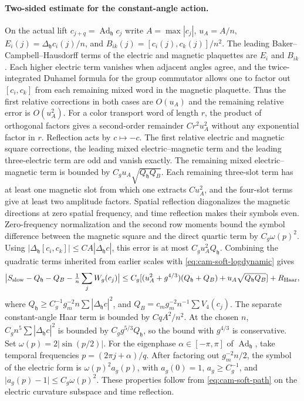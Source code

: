 \documentclass[11pt,a4paper]{article}
\numberwithin{equation}{section}
\newcommand{\hper}{\mathfrak h}
\begin{document}
\paragraph{Two-sided estimate for the constant-angle action.}
On the actual lift \(c_{j+q}=\operatorname{Ad}_\hper  c_j\) write \(A=\max|c_j|\), \(u_A=A/n\), \(E_i(j)=\Delta_\hper c_i(j)/n\), and \(B_{ik}(j)=[c_i(j),c_k(j)]/n^2\). The leading Baker--Campbell--Hausdorff terms of the electric and magnetic plaquettes are \(E_i\) and \(B_{ik}\). Each higher electric term vanishes when adjacent angles agree, and the twice-integrated Duhamel formula for the group commutator allows one to factor out \([c_i,c_k]\) from each remaining mixed word in the magnetic plaquette. Thus the first relative corrections in both cases are \(O(u_A)\) and the remaining relative error is \(O(u_A^2)\). For a color transport word of length \(r\), the product of orthogonal factors gives a second-order remainder \(Cr^2u_A^2\) without any exponential factor in \(r\). Reflection acts by \(c\mapsto-c\). The first relative electric and magnetic square corrections, the leading mixed electric--magnetic term and the leading three-electric term are odd and vanish exactly. The remaining mixed electric--magnetic term is bounded by \(C_gu_A\sqrt{Q_\hper Q_B}\). Each remaining three-slot term has at least one magnetic slot from which one extracts \(Cu_A^2\), and the four-slot terms give at least two amplitude factors. Spatial reflection diagonalizes the magnetic directions at zero spatial frequency, and time reflection makes their symbols even. Zero-frequency normalization and the second row moments bound the symbol difference between the magnetic square and the direct quartic term by \(C_g\omega(p)^2\). Using
\(\lvert\Delta_\hper [c_i,c_k]\rvert\le CA|\Delta_\hper c|\), this error is at most \(C_g u_A^2 Q_\hper \). Combining the quadratic terms inherited from earlier scales with \eqref{eq:cam-soft-logdynamic} gives
\begin{equation}
 \bigl|S_{\rm slow}-Q_\hper -Q_B-\tfrac1n\sum_jW_g(c_j)\bigr|
 \le C_g[(u_A^2+g^{4/3})(Q_\hper +Q_B)+u_A\sqrt{Q_\hper Q_B}]+R_{\mathrm{Haar}},
 \label{eq:cam-soft-slowform}
\end{equation}
where \(Q_\hper \ge C_g^{-1}g_m^{-2}n\sum|\Delta_\hper c|^2\),
and \(Q_B=c_m g_m^{-2}n^{-1}\sum V_4(c_j)\). The separate constant-angle Haar term is bounded by \(C q A^2/n^2\). At the chosen \(n\), \(C_g n^5\sum|\Delta_\hper c|^2\) is bounded by \(C_g g^{5/3}Q_\hper \), so the bound with \(g^{4/3}\) is conservative. Set \(\omega(p)=2|\sin(p/2)|\). For the eigenphase \(\alpha\in[-\pi,\pi]\) of \(\operatorname{Ad}_\hper \), take temporal frequencies \(p=(2\pi j+\alpha)/q\). After factoring out \(g_m^{-2}n/2\), the symbol of the electric form is \(\omega(p)^2 a_g(p)\), with \(a_g(0)=1\), \(a_g\ge C_g^{-1}\), and
\(\lvert a_g(p)-1\rvert\le C_g\omega(p)^2\). These properties follow from \eqref{eq:cam-soft-path} on the electric curvature subspace and time reflection.
\end{document}
